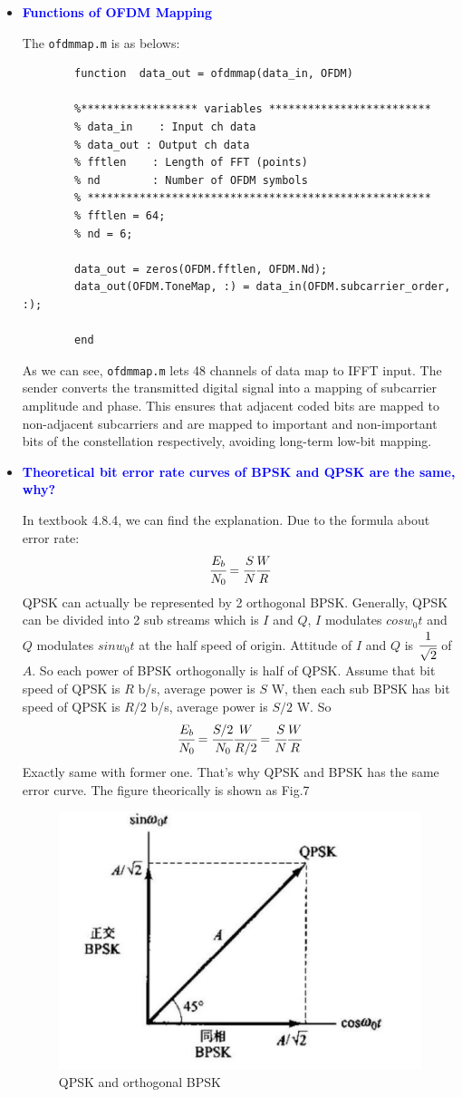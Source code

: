 \documentclass{article}
\begin{document}
\begin{itemize}
	\item 
	\textcolor{blue}{\textbf{{Functions of OFDM Mapping}}}
	
	The \lstinline|ofdmmap.m| is as belows:
	\begin{lstlisting}
		function  data_out = ofdmmap(data_in, OFDM)
		
		%****************** variables *************************
		% data_in    : Input ch data
		% data_out : Output ch data
		% fftlen    : Length of FFT (points)
		% nd        : Number of OFDM symbols
		% *****************************************************
		% fftlen = 64;
		% nd = 6;
		
		data_out = zeros(OFDM.fftlen, OFDM.Nd);
		data_out(OFDM.ToneMap, :) = data_in(OFDM.subcarrier_order, :);
		
		end
	\end{lstlisting}
	As we can see, \lstinline|ofdmmap.m|  lets 48 channels of data map to IFFT input. The sender converts the transmitted digital signal into a mapping of subcarrier amplitude and phase. This ensures that adjacent coded bits are mapped to non-adjacent subcarriers and are mapped to important and non-important bits of the constellation respectively, avoiding long-term low-bit mapping.
	\item 
	\textcolor{blue}{\textbf{{Theoretical bit error rate curves of BPSK and QPSK are the same, why?}}}
	
	In textbook 4.8.4, we can find the explanation. Due to the formula about error rate:
	$$ \cfrac{E_b}{N_0}=\cfrac{S}{N}\cfrac{W}{R}$$
	QPSK can actually be represented by 2 orthogonal BPSK. Generally, QPSK can be divided into 2 sub streams which is $ I $ and $ Q $, $ I $ modulates $ cosw_0t $ and $ Q $ modulates $ sinw_0t $ at the half speed of origin. Attitude of $ I $ and $ Q $ is $ \cfrac{1}{\sqrt{2}} $ of $ A $. So each power of BPSK orthogonally is half of QPSK. Assume that bit speed of QPSK is $ R $ b/s, average power is $ S $ W, then each sub BPSK has bit speed of QPSK is $ R/2 $ b/s, average power is $ S/2 $ W. So
	$$  \cfrac{E_b}{N_0}=\cfrac{S/2}{N_0}\cfrac{W}{R/2}=\cfrac{S}{N}\cfrac{W}{R}$$
	Exactly same with former one. That's why QPSK and BPSK has the same error curve. The figure theorically is shown as Fig.7
	\begin{figure}[!h]
		\centering
		\includegraphics[width=0.7\linewidth]{10}
		\caption{QPSK and orthogonal BPSK }
		\label{fig:10}
	\end{figure}


\end{itemize}
\end{document}
